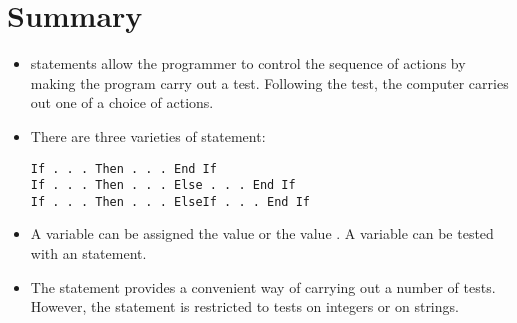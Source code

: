 	\section{Summary}
		\begin{itemize}
			\item {} statements allow the programmer to control the sequence of actions by making the program carry out a test. Following the test, the computer carries out one of a choice of actions.
			\item There are three varieties of  statement:
				\begin{lstlisting}
If . . . Then . . . End If
If . . . Then . . . Else . . . End If
If . . . Then . . . ElseIf . . . End If
				\end{lstlisting}
			\item A  variable can be assigned the value  or the value . A  variable can be tested with an  statement.
			\item The  statement provides a convenient way of carrying out a number of tests. However, the  statement is restricted to tests on integers or on strings.
		\end{itemize}
	
